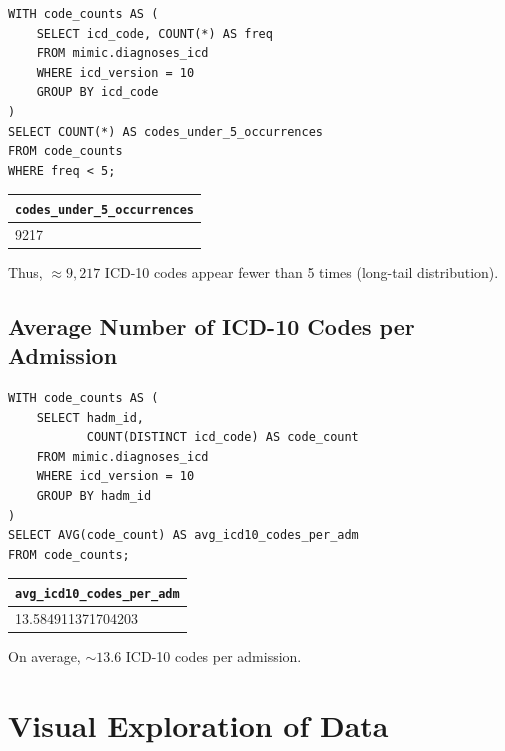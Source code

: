 \begin{verbatim}
WITH code_counts AS (
    SELECT icd_code, COUNT(*) AS freq
    FROM mimic.diagnoses_icd
    WHERE icd_version = 10
    GROUP BY icd_code
)
SELECT COUNT(*) AS codes_under_5_occurrences
FROM code_counts
WHERE freq < 5;
\end{verbatim}
\begin{center}
\begin{tabular}{l}
\hline
\texttt{codes\_under\_5\_occurrences} \\
\hline
9217 \\
\hline
\end{tabular}
\end{center}
Thus, \(\approx9{,}217\) ICD-10 codes appear fewer than 5 times (long-tail distribution).

\subsection{Average Number of ICD-10 Codes per Admission}
\begin{verbatim}
WITH code_counts AS (
    SELECT hadm_id,
           COUNT(DISTINCT icd_code) AS code_count
    FROM mimic.diagnoses_icd
    WHERE icd_version = 10
    GROUP BY hadm_id
)
SELECT AVG(code_count) AS avg_icd10_codes_per_adm
FROM code_counts;
\end{verbatim}
\begin{center}
\begin{tabular}{l}
\hline
\texttt{avg\_icd10\_codes\_per\_adm} \\
\hline
13.584911371704203 \\
\hline
\end{tabular}
\end{center}
On average, \(\sim13.6\) ICD-10 codes per admission.

\section{Visual Exploration of Data}


